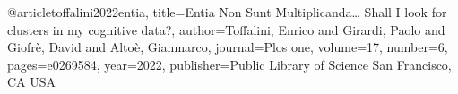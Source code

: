 @article{toffalini2022entia,
  title={Entia Non Sunt Multiplicanda… Shall I look for clusters in my cognitive data?},
  author={Toffalini, Enrico and Girardi, Paolo and Giofr{\`e}, David and Alto{\`e}, Gianmarco},
  journal={Plos one},
  volume={17},
  number={6},
  pages={e0269584},
  year={2022},
  publisher={Public Library of Science San Francisco, CA USA}
}




